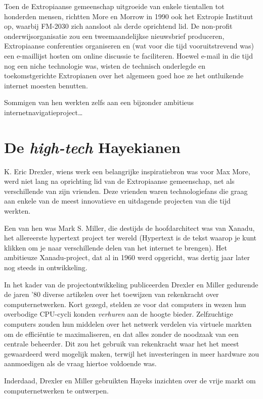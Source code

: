 \documentclass[
  a5paper,
  smalldemyvopaper,11pt,twoside,onecolumn,openright,extrafontsizes,
hidelinks]{memoir}
\begin{document}
Toen de Extropiaanse gemeenschap uitgroeide van enkele tientallen tot
honderden mensen, richtten More en Morrow in 1990 ook het Extropie
Instituut op, waarbij FM-2030 zich aansloot als derde oprichtend lid. De
non-profit onderwijsorganisatie zou een tweemaandelijkse nieuwsbrief
produceren, Extropiaanse conferenties organiseren en (wat voor die tijd
vooruitstrevend was) een e-maillijst hosten om online discussie te
faciliteren. Hoewel e-mail in die tijd nog een niche technologie was,
wisten de technisch onderlegde en toekomstgerichte Extropianen over het
algemeen goed hoe ze het ontluikende internet moesten benutten.

Sommigen van hen werkten zelfs aan een bijzonder ambitieus
internetnavigatieproject\ldots{}

\section{\texorpdfstring{De \emph{high-tech}
Hayekianen}{De high-tech Hayekianen}}\label{de-high-tech-hayekianen}

K. Eric Drexler, wiens werk een belangrijke inspiratiebron was voor Max
More, werd niet lang na oprichting lid van de Extropiaanse gemeenschap,
net als verschillende van zijn vrienden. Deze vrienden waren
technologiefans die graag aan enkele van de meest innovatieve en
uitdagende projecten van die tijd werkten.

Een van hen was Mark S. Miller, die destijds de hoofdarchitect was van
Xanadu, het allereerste hypertext project ter wereld (Hypertext is de
tekst waarop je kunt klikken om je naar verschillende delen van het
internet te brengen). Het ambitieuze Xanadu-project, dat al in 1960 werd
opgericht, was dertig jaar later nog steeds in ontwikkeling.

In het kader van de projectontwikkeling publiceerden Drexler en Miller
gedurende de jaren '80 diverse artikelen over het toewijzen van
rekenkracht over computernetwerken. Kort gezegd, stelden ze voor dat
computers in wezen hun overbodige CPU-cycli konden \emph{verhuren} aan
de hoogte bieder. Zelfzuchtige computers zouden hun middelen over het
netwerk verdelen via virtuele markten om de efficiëntie te
maximaliseren, en dat alles zonder de noodzaak van een centrale
beheerder. Dit zou het gebruik van rekenkracht waar het het meest
gewaardeerd werd mogelijk maken, terwijl het investeringen in meer
hardware zou aanmoedigen als de vraag hiertoe voldoende was.

Inderdaad, Drexler en Miller gebruikten Hayeks inzichten over de vrije
markt om computernetwerken te ontwerpen.
\end{document}
